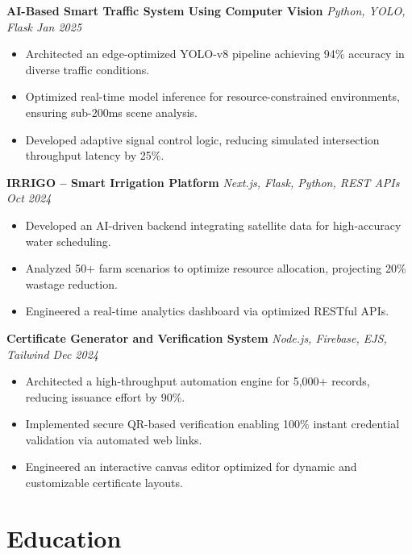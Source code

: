 \documentclass[10pt, a4paper]{article}
\begin{document}
\vspace{3pt}

\textbf{AI-Based Smart Traffic System Using Computer Vision} \hfill \textit{Python, YOLO, Flask \quad Jan 2025}
\begin{itemize}
\item Architected an edge-optimized YOLO-v8 pipeline achieving 94\% accuracy in diverse traffic conditions.
\item Optimized real-time model inference for resource-constrained environments, ensuring sub-200ms scene analysis.
\item Developed adaptive signal control logic, reducing simulated intersection throughput latency by 25\%.
\end{itemize}

\vspace{3pt}

\textbf{IRRIGO -- Smart Irrigation Platform} \hfill \textit{Next.js, Flask, Python, REST APIs \quad Oct 2024}
\begin{itemize}
\item Developed an AI-driven backend integrating satellite data for high-accuracy water scheduling.
\item Analyzed 50+ farm scenarios to optimize resource allocation, projecting 20\% wastage reduction.
\item Engineered a real-time analytics dashboard via optimized RESTful APIs.
\end{itemize}

\vspace{3pt}

\textbf{Certificate Generator and Verification System} \hfill \textit{Node.js, Firebase, EJS, Tailwind \quad Dec 2024}
\begin{itemize}
\item Architected a high-throughput automation engine for 5,000+ records, reducing issuance effort by 90\%.
\item Implemented secure QR-based verification enabling 100\% instant credential validation via automated web links.
\item Engineered an interactive canvas editor optimized for dynamic and customizable certificate layouts.
\end{itemize}

\section*{Education}
\end{document}

